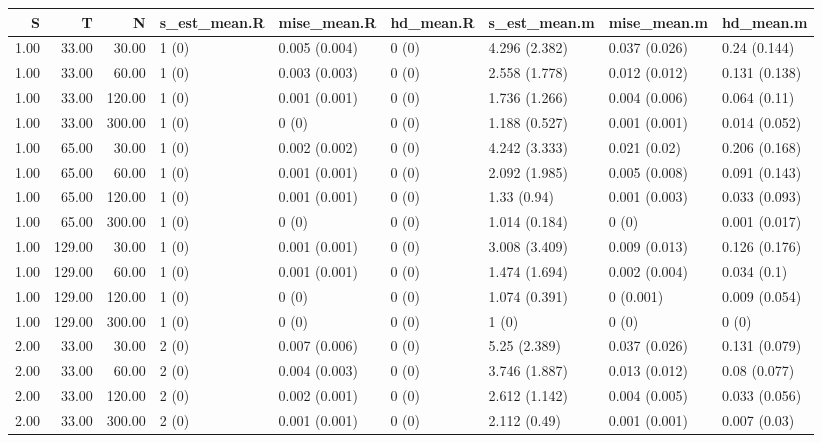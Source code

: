 \begin{table}[ht]
\centering
\begin{tabular}{rrrllllll}
  \hline
S & T & N & s\_est\_mean.R & mise\_mean.R & hd\_mean.R & s\_est\_mean.m & mise\_mean.m & hd\_mean.m \\ 
  \hline
1.00 & 33.00 & 30.00 & 1 (0) & 0.005 (0.004) & 0 (0) & 4.296 (2.382) & 0.037 (0.026) & 0.24 (0.144) \\ 
  1.00 & 33.00 & 60.00 & 1 (0) & 0.003 (0.003) & 0 (0) & 2.558 (1.778) & 0.012 (0.012) & 0.131 (0.138) \\ 
  1.00 & 33.00 & 120.00 & 1 (0) & 0.001 (0.001) & 0 (0) & 1.736 (1.266) & 0.004 (0.006) & 0.064 (0.11) \\ 
  1.00 & 33.00 & 300.00 & 1 (0) & 0 (0) & 0 (0) & 1.188 (0.527) & 0.001 (0.001) & 0.014 (0.052) \\ 
  1.00 & 65.00 & 30.00 & 1 (0) & 0.002 (0.002) & 0 (0) & 4.242 (3.333) & 0.021 (0.02) & 0.206 (0.168) \\ 
  1.00 & 65.00 & 60.00 & 1 (0) & 0.001 (0.001) & 0 (0) & 2.092 (1.985) & 0.005 (0.008) & 0.091 (0.143) \\ 
  1.00 & 65.00 & 120.00 & 1 (0) & 0.001 (0.001) & 0 (0) & 1.33 (0.94) & 0.001 (0.003) & 0.033 (0.093) \\ 
  1.00 & 65.00 & 300.00 & 1 (0) & 0 (0) & 0 (0) & 1.014 (0.184) & 0 (0) & 0.001 (0.017) \\ 
  1.00 & 129.00 & 30.00 & 1 (0) & 0.001 (0.001) & 0 (0) & 3.008 (3.409) & 0.009 (0.013) & 0.126 (0.176) \\ 
  1.00 & 129.00 & 60.00 & 1 (0) & 0.001 (0.001) & 0 (0) & 1.474 (1.694) & 0.002 (0.004) & 0.034 (0.1) \\ 
  1.00 & 129.00 & 120.00 & 1 (0) & 0 (0) & 0 (0) & 1.074 (0.391) & 0 (0.001) & 0.009 (0.054) \\ 
  1.00 & 129.00 & 300.00 & 1 (0) & 0 (0) & 0 (0) & 1 (0) & 0 (0) & 0 (0) \\ 
  2.00 & 33.00 & 30.00 & 2 (0) & 0.007 (0.006) & 0 (0) & 5.25 (2.389) & 0.037 (0.026) & 0.131 (0.079) \\ 
  2.00 & 33.00 & 60.00 & 2 (0) & 0.004 (0.003) & 0 (0) & 3.746 (1.887) & 0.013 (0.012) & 0.08 (0.077) \\ 
  2.00 & 33.00 & 120.00 & 2 (0) & 0.002 (0.001) & 0 (0) & 2.612 (1.142) & 0.004 (0.005) & 0.033 (0.056) \\ 
  2.00 & 33.00 & 300.00 & 2 (0) & 0.001 (0.001) & 0 (0) & 2.112 (0.49) & 0.001 (0.001) & 0.007 (0.03) \\ 

\end{tabular}
\end{table}
